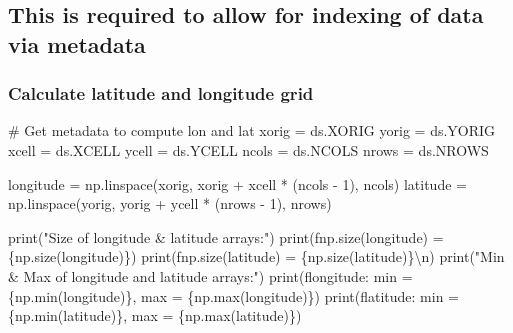 \documentclass[
  letterpaper,
  DIV=11,
  numbers=noendperiod]{scrreprt}
\newenvironment{Shaded}{\begin{snugshade}}{\end{snugshade}}
\newcommand{\BuiltInTok}[1]{\textcolor[rgb]{0.00,0.23,0.31}{#1}}
\newcommand{\CharTok}[1]{\textcolor[rgb]{0.13,0.47,0.30}{#1}}
\newcommand{\CommentTok}[1]{\textcolor[rgb]{0.37,0.37,0.37}{#1}}
\newcommand{\DecValTok}[1]{\textcolor[rgb]{0.68,0.00,0.00}{#1}}
\newcommand{\NormalTok}[1]{\textcolor[rgb]{0.00,0.23,0.31}{#1}}
\newcommand{\OperatorTok}[1]{\textcolor[rgb]{0.37,0.37,0.37}{#1}}
\newcommand{\SpecialCharTok}[1]{\textcolor[rgb]{0.37,0.37,0.37}{#1}}
\newcommand{\SpecialStringTok}[1]{\textcolor[rgb]{0.13,0.47,0.30}{#1}}
\newcommand{\StringTok}[1]{\textcolor[rgb]{0.13,0.47,0.30}{#1}}
\begin{document}
\subsection{This is required to allow for indexing of data via
metadata}\label{this-is-required-to-allow-for-indexing-of-data-via-metadata}

\subsubsection{Calculate latitude and longitude
grid}\label{calculate-latitude-and-longitude-grid}

\begin{Shaded}
\begin{Highlighting}[]
\CommentTok{\# Get metadata to compute lon and lat}
\NormalTok{xorig }\OperatorTok{=}\NormalTok{ ds.XORIG}
\NormalTok{yorig }\OperatorTok{=}\NormalTok{ ds.YORIG}
\NormalTok{xcell }\OperatorTok{=}\NormalTok{ ds.XCELL}
\NormalTok{ycell }\OperatorTok{=}\NormalTok{ ds.YCELL}
\NormalTok{ncols }\OperatorTok{=}\NormalTok{ ds.NCOLS}
\NormalTok{nrows }\OperatorTok{=}\NormalTok{ ds.NROWS}

\NormalTok{longitude }\OperatorTok{=}\NormalTok{ np.linspace(xorig, xorig }\OperatorTok{+}\NormalTok{ xcell }\OperatorTok{*}\NormalTok{ (ncols }\OperatorTok{{-}} \DecValTok{1}\NormalTok{), ncols)}
\NormalTok{latitude }\OperatorTok{=}\NormalTok{ np.linspace(yorig, yorig }\OperatorTok{+}\NormalTok{ ycell }\OperatorTok{*}\NormalTok{ (nrows }\OperatorTok{{-}} \DecValTok{1}\NormalTok{), nrows)}

\BuiltInTok{print}\NormalTok{(}\StringTok{"Size of longitude \& latitude arrays:"}\NormalTok{)}
\BuiltInTok{print}\NormalTok{(}\SpecialStringTok{f\textquotesingle{}np.size(longitude) = }\SpecialCharTok{\{}\NormalTok{np}\SpecialCharTok{.}\NormalTok{size(longitude)}\SpecialCharTok{\}}\SpecialStringTok{\textquotesingle{}}\NormalTok{)}
\BuiltInTok{print}\NormalTok{(}\SpecialStringTok{f\textquotesingle{}np.size(latitude) = }\SpecialCharTok{\{}\NormalTok{np}\SpecialCharTok{.}\NormalTok{size(latitude)}\SpecialCharTok{\}}\CharTok{\textbackslash{}n}\SpecialStringTok{\textquotesingle{}}\NormalTok{)}
\BuiltInTok{print}\NormalTok{(}\StringTok{"Min \& Max of longitude and latitude arrays:"}\NormalTok{)}
\BuiltInTok{print}\NormalTok{(}\SpecialStringTok{f\textquotesingle{}longitude: min = }\SpecialCharTok{\{}\NormalTok{np}\SpecialCharTok{.}\BuiltInTok{min}\NormalTok{(longitude)}\SpecialCharTok{\}}\SpecialStringTok{, max = }\SpecialCharTok{\{}\NormalTok{np}\SpecialCharTok{.}\BuiltInTok{max}\NormalTok{(longitude)}\SpecialCharTok{\}}\SpecialStringTok{\textquotesingle{}}\NormalTok{)}
\BuiltInTok{print}\NormalTok{(}\SpecialStringTok{f\textquotesingle{}latitude: min = }\SpecialCharTok{\{}\NormalTok{np}\SpecialCharTok{.}\BuiltInTok{min}\NormalTok{(latitude)}\SpecialCharTok{\}}\SpecialStringTok{, max = }\SpecialCharTok{\{}\NormalTok{np}\SpecialCharTok{.}\BuiltInTok{max}\NormalTok{(latitude)}\SpecialCharTok{\}}\SpecialStringTok{\textquotesingle{}}\NormalTok{)}
\end{Highlighting}
\end{Shaded}
\end{document}
